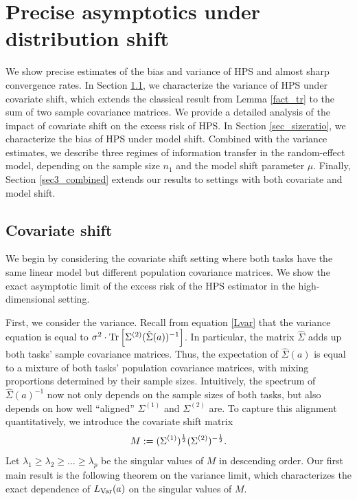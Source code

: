 \section{Precise asymptotics under distribution shift}\label{sec_main}

We show precise estimates of the bias and variance of HPS and almost sharp convergence rates.
In Section \ref{sec3_cov}, we characterize the variance of HPS under covariate shift, which extends the classical result from Lemma \ref{fact_tr} to the sum of two sample covariance matrices.
We provide a detailed analysis of the impact of covariate shift on the excess risk of HPS.
In Section \ref{sec_sizeratio}, we characterize the bias of HPS under model shift.
Combined with the variance estimates, we describe three regimes of information transfer in the random-effect model, depending on the sample size $n_1$ and the model shift parameter $\mu$.
Finally, Section \ref{sec3_combined} extends our results to settings with both covariate and model shift.


\subsection{Covariate shift}\label{sec3_cov}

We begin by considering the covariate shift setting where both tasks have the same linear model but different population covariance matrices.
We show the exact asymptotic limit of the excess risk of the HPS estimator in the high-dimensional setting.

First, we consider the variance. Recall from equation \eqref{Lvar} that the variance equation is equal to $\sigma^2 \cdot \operatorname{Tr}\left[\Sigma^{(2)} (\hat\Sigma(a))^{-1}\right]$.
In particular, the matrix $\hat{\Sigma}$ adds up both tasks' sample covariance matrices.
Thus, the expectation of $\hat{\Sigma}(a)$ is equal to a mixture of both tasks' population covariance matrices, with mixing proportions determined by their sample sizes.
Intuitively, the spectrum of $\hat{\Sigma}(a)^{-1}$ now not only depends on the sample sizes of both tasks, but also depends on how well ``aligned'' $\Sigma^{(1)}$ and $\Sigma^{(2)}$ are.
To capture this alignment quantitatively, we introduce the covariate shift matrix %
$$ M := (\Sigma^{(1)})^{\frac 1 2}(\Sigma^{(2)})^{-\frac 1 2}.$$
Let $\lambda_1 \ge \lambda_2 \ge \dots\ge \lambda_p $ be the singular values of $M$ in descending order.
Our first main result is the following theorem on the variance limit, which characterizes the exact dependence of $L_{\operatorname{Var}}(a)$ on the singular values of $M$.


